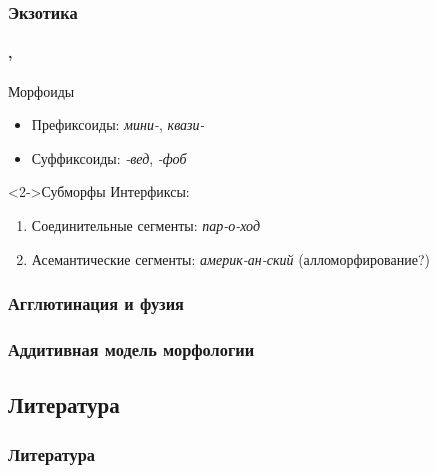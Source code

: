 \begin{frame}
    \frametitle{Экзотика}
    \framesubtitle{\autocite[91--97]{plungyan:2003}, \autocite[15, 102]{zubova_menshikova:2014}}

    \begin{block}{Морфоиды}
        \begin{itemize}
            \item Префиксоиды: \textit{мини-}, \textit{квази-}
            \item Суффиксоиды: \textit{-вед}, \textit{-фоб}
        \end{itemize}
    \end{block}

    \begin{block}<2->{Субморфы}
        Интерфиксы: \begin{enumerate}
            \item Соединительные сегменты: \textit{пар-о-ход}
            \item Асемантические сегменты: \textit{америк-ан-ский} (алломорфирование?)
        \end{enumerate}
    \end{block}
\end{frame}

\begin{frame}
    \frametitle{Агглютинация и фузия}
\end{frame}

\begin{frame}
    \frametitle{Аддитивная модель морфологии}
\end{frame}

\subsection{Литература}


\begin{frame}[allowframebreaks]
    \frametitle{Литература}
    \printbibliography
\end{frame}
